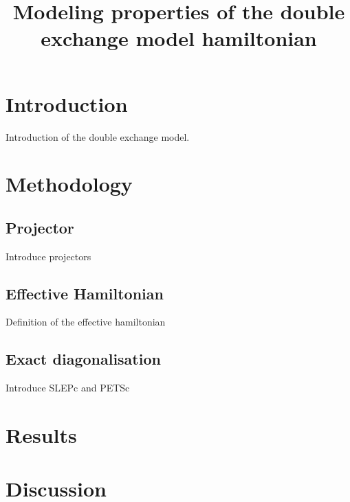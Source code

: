 \documentclass[ openright,titlepage,numbers=noenddot,headinclude,twoside,%
                footinclude=true,cleardoublepage=empty,abstractoff,%
                BCOR=5mm,paper=a4,fontsize=11pt,%
                ngerman,american,%
]{scrreprt}
\title{Modeling properties of the double exchange model hamiltonian}
\begin{document}
\maketitle
\thispagestyle{fancy}
\section{Introduction}

Introduction of the double exchange model.

\section{Methodology}

\subsection{Projector}

Introduce projectors

\subsection{Effective Hamiltonian}

Definition of the effective hamiltonian

\subsection{Exact diagonalisation}

Introduce SLEPc and PETSc

\section{Results}
\section{Discussion}
\end{document}
